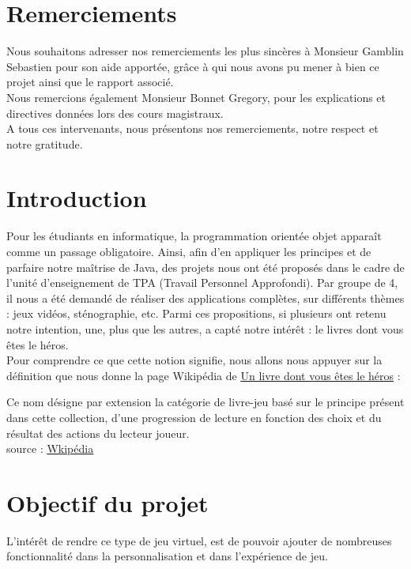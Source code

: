 \documentclass[12pt]{article}
\begin{document}
\mbox{}
\section{Remerciements}
Nous souhaitons adresser nos remerciements les plus sincères à Monsieur Gamblin Sebastien pour son aide apportée, grâce à qui nous avons pu mener à bien ce projet ainsi que le rapport associé.\\
Nous remercions également Monsieur Bonnet Gregory, pour les explications et directives données lors des cours magistraux.\\

A tous ces intervenants, nous présentons nos remerciements, notre respect et notre gratitude.

\newpage
\tableofcontents
\newpage


\section{Introduction} %
Pour les étudiants en informatique, la programmation orientée objet apparaît comme un passage obligatoire. Ainsi, afin d’en appliquer les principes et de parfaire notre maîtrise de Java, des projets nous ont été proposés dans le cadre de l’unité d’enseignement de TPA (Travail Personnel Approfondi). Par groupe de 4, il nous a été demandé de réaliser des applications complètes, sur différents thèmes : jeux vidéos, sténographie, etc.
Parmi ces propositions, si plusieurs ont retenu notre intention, une, plus que les autres, a
capté notre intérêt : le livres dont vous êtes le héros.\\

Pour comprendre ce que cette notion signifie, nous allons nous appuyer sur la définition que nous donne la page Wikipédia de  \href{https://fr.wikipedia.org/wiki/Un_livre_dont_vous_%C3%AAtes_le_h%C3%A9ros}{\underline{Un livre dont vous êtes le héros}} :
\begin{displayquote}
	Ce nom désigne par extension la catégorie de livre-jeu basé sur le principe présent dans cette collection, d'une progression de lecture en fonction des choix et du résultat des actions du lecteur joueur.\\
	{\small source : \href{https://fr.wikipedia.org/wiki/Un_livre_dont_vous_%C3%AAtes_le_h%C3%A9ros}{\underline{Wkipédia}}}
\end{displayquote}

\section{Objectif du projet} %
L'intérêt de rendre ce type de jeu virtuel, est de pouvoir ajouter de nombreuses fonctionnalité dans la personnalisation et dans l'expérience de jeu.\\
\end{document}
